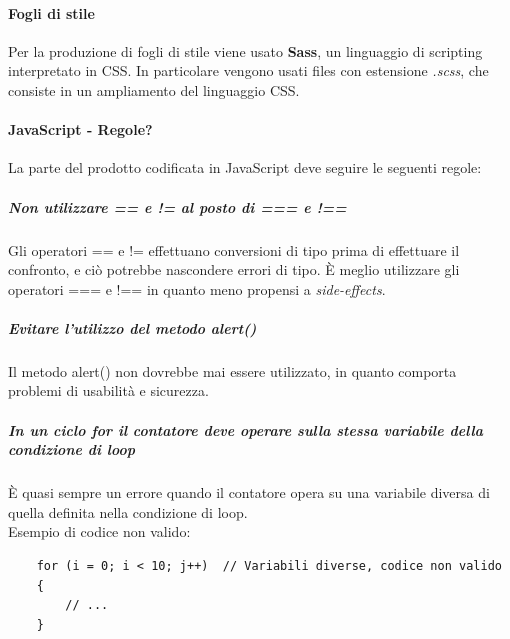  \paragraph{Fogli di stile}
 Per la produzione di fogli di stile viene usato \textbf{Sass}, un linguaggio di scripting interpretato in CSS. In particolare vengono usati files con estensione \textit{.scss}, che consiste in un ampliamento del linguaggio CSS.
\paragraph{JavaScript - Regole?}
La parte del prodotto codificata in JavaScript deve seguire le seguenti regole:
\subparagraph{Non utilizzare == e != al posto di === e !==}
Gli operatori == e != effettuano conversioni di tipo prima di effettuare il confronto, e ciò potrebbe nascondere errori di tipo. È meglio utilizzare gli operatori === e !== in quanto meno propensi a \textit{side-effects}.
\subparagraph{Evitare l'utilizzo del metodo alert()}
Il metodo alert() non dovrebbe mai essere utilizzato, in quanto comporta problemi di usabilità e sicurezza.
\subparagraph{In un ciclo for il contatore deve operare sulla stessa variabile della condizione di loop}
È quasi sempre un errore quando il contatore opera su una variabile diversa di quella definita nella condizione di loop.\\
Esempio di codice non valido:
\begin{verbatim}
	for (i = 0; i < 10; j++)  // Variabili diverse, codice non valido
	{  
  		// ...
	}
\end{verbatim}

